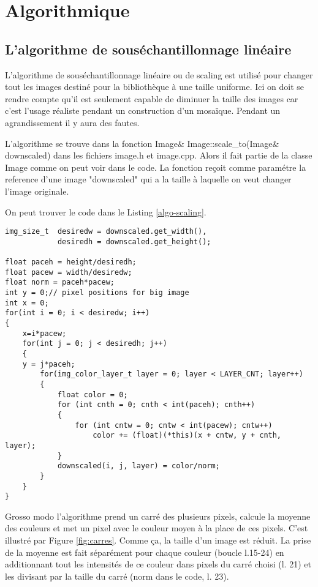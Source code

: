 \documentclass[a4paper]{article}
\begin{document}
\section{Algorithmique}

\subsection{L'algorithme de sous\'echantillonnage lin\'eaire}

L'algorithme de sous\'echantillonnage lin\'eaire ou de scaling est utilis\'e pour changer tout les images destin\'e pour la bibliothèque \`a une taille uniforme.
Ici on doit se rendre compte qu'il est seulement capable de diminuer la taille des images car c'est l'usage r\'ealiste pendant un construction d'un mosa\"{i}que.  
Pendant un agrandissement il y aura des fautes.

L'algorithme se trouve dans la fonction Image\& Image::scale\_to(Image\& downscaled) dans les fichiers image.h et image.cpp.
Alors il fait partie de la classe Image comme on peut voir dans le code.
La fonction re\c{c}oit comme param\'etre la reference d'une image "downscaled" qui a la taille \`a laquelle on veut changer l'image originale.

On peut trouver le code dans le Listing \ref{algo-scaling}.
\begin{lstlisting}
img_size_t	desiredw = downscaled.get_width(),
			desiredh = downscaled.get_height();

float paceh = height/desiredh;
float pacew = width/desiredw;
float norm = paceh*pacew;
int y = 0;// pixel positions for big image
int x = 0;
for(int i = 0; i < desiredw; i++)
{
	x=i*pacew;
	for(int j = 0; j < desiredh; j++)
	{
	y = j*paceh;
		for(img_color_layer_t layer = 0; layer < LAYER_CNT; layer++)
		{
			float color = 0;
			for (int cnth = 0; cnth < int(paceh); cnth++)
			{
				for (int cntw = 0; cntw < int(pacew); cntw++)
					color += (float)(*this)(x + cntw, y + cnth, layer);
			}
			downscaled(i, j, layer) = color/norm;
		}
	}	
}
\end{lstlisting}

 Grosso modo l'algorithme prend un carr\'e des plusieurs pixels, calcule la moyenne des couleurs et met un pixel avec le couleur moyen \`a la place de ces pixels.
C'est illustr\'e par Figure \ref{fig:carres}.
Comme \c{c}a, la taille d'un image est r\'eduit.
La prise de la moyenne est fait s\'epar\'ement pour  chaque couleur (boucle l.15-24) en additionnant tout les intensit\'es de ce couleur dans pixels du carr\'e choisi (l. 21) et les divisant par la taille du carr\'e (norm dans le code, l. 23).
\end{document}

